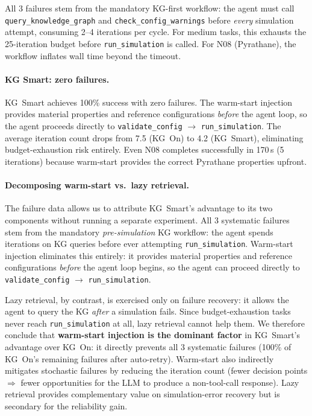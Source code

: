 \documentclass[twocolumn]{article}
\begin{document}
All 3 failures stem from the mandatory KG-first workflow: the agent
must call \texttt{query\_knowledge\_graph} and
\texttt{check\_config\_warnings} before \emph{every} simulation attempt,
consuming 2--4 iterations per cycle.  For medium tasks, this exhausts
the 25-iteration budget before \texttt{run\_simulation} is called.
For N08 (Pyrathane), the workflow inflates wall time beyond the timeout.

\paragraph{KG Smart: zero failures.}
KG~Smart achieves 100\% success with zero failures.  The warm-start
injection provides material properties and reference configurations
\emph{before} the agent loop, so the agent proceeds directly to
\texttt{validate\_config} $\to$ \texttt{run\_simulation}.  The average
iteration count drops from 7.5 (KG~On) to 4.2 (KG~Smart), eliminating
budget-exhaustion risk entirely.  Even N08 completes successfully in
170\,s (5 iterations) because warm-start provides the correct Pyrathane
properties upfront.

\paragraph{Decomposing warm-start vs.\ lazy retrieval.}
The failure data allows us to attribute KG~Smart's advantage to its
two components without running a separate experiment.  All 3 systematic
failures stem from the mandatory \emph{pre-simulation} KG workflow:
the agent spends iterations on KG queries before ever attempting
\texttt{run\_simulation}.  Warm-start injection eliminates this
entirely: it provides material properties and reference configurations
\emph{before} the agent loop begins, so the agent can proceed directly
to \texttt{validate\_config} $\to$ \texttt{run\_simulation}.

Lazy retrieval, by contrast, is exercised only on failure recovery:
it allows the agent to query the KG \emph{after} a simulation fails.
Since budget-exhaustion tasks never reach \texttt{run\_simulation}
at all, lazy retrieval cannot help them.  We therefore conclude
that \textbf{warm-start injection is the dominant factor} in
KG~Smart's advantage over KG~On: it directly prevents all 3 systematic
failures (100\% of KG~On's remaining failures after auto-retry).
Warm-start also indirectly mitigates stochastic failures by reducing
the iteration count (fewer decision points $\Rightarrow$ fewer
opportunities for the LLM to produce a non-tool-call response).
Lazy retrieval provides complementary value on simulation-error
recovery but is secondary for the reliability gain.
\end{document}
